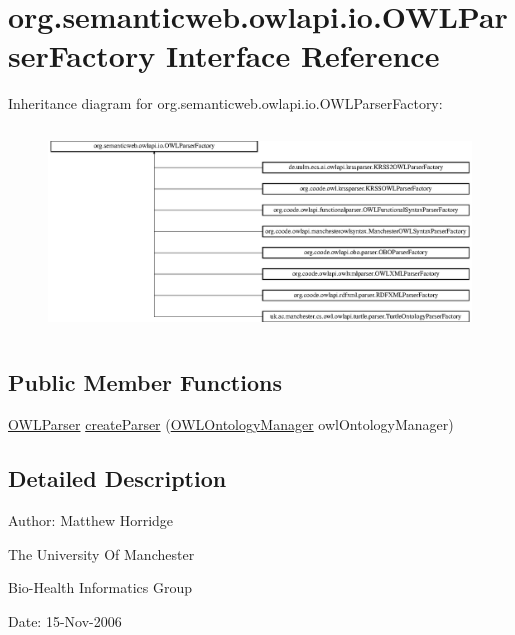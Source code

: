 \hypertarget{interfaceorg_1_1semanticweb_1_1owlapi_1_1io_1_1_o_w_l_parser_factory}{\section{org.\-semanticweb.\-owlapi.\-io.\-O\-W\-L\-Parser\-Factory Interface Reference}
\label{interfaceorg_1_1semanticweb_1_1owlapi_1_1io_1_1_o_w_l_parser_factory}
}
Inheritance diagram for org.\-semanticweb.\-owlapi.\-io.\-O\-W\-L\-Parser\-Factory\-:\begin{figure}[H]
\begin{center}
\leavevmode
\includegraphics[height=5.466377cm]{interfaceorg_1_1semanticweb_1_1owlapi_1_1io_1_1_o_w_l_parser_factory}
\end{center}
\end{figure}
\subsection*{Public Member Functions}
\begin{DoxyCompactItemize}
\item 
\hyperlink{interfaceorg_1_1semanticweb_1_1owlapi_1_1io_1_1_o_w_l_parser}{O\-W\-L\-Parser} \hyperlink{interfaceorg_1_1semanticweb_1_1owlapi_1_1io_1_1_o_w_l_parser_factory_a50b523e7ca347eaf47a857a210eca9ef}{create\-Parser} (\hyperlink{interfaceorg_1_1semanticweb_1_1owlapi_1_1model_1_1_o_w_l_ontology_manager}{O\-W\-L\-Ontology\-Manager} owl\-Ontology\-Manager)
\end{DoxyCompactItemize}


\subsection{Detailed Description}
Author\-: Matthew Horridge\par
 The University Of Manchester\par
 Bio-\/\-Health Informatics Group\par
 Date\-: 15-\/\-Nov-\/2006\par
\par


